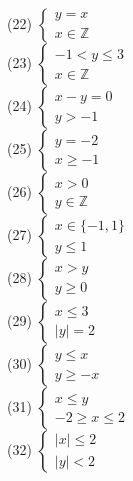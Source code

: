 \documentclass[10pt]{article}
\begin{document}
\begin{enumerate}
(22) \(\left\{\begin{array}{l}y=x \\ x \in \mathbb{Z}\end{array}\right.\)\\
(23) \(\left\{\begin{array}{l}-1<y \leqslant 3 \\ x \in \mathbb{Z}\end{array}\right.\)\\
(24) \(\left\{\begin{array}{l}x-y=0 \\ y>-1\end{array}\right.\)\\
(25) \(\left\{\begin{array}{l}y=-2 \\ x \geqslant-1\end{array}\right.\)\\
(26) \(\left\{\begin{array}{l}x>0 \\ y \in \mathbb{Z}\end{array}\right.\)\\
(27) \(\left\{\begin{array}{l}x \in\{-1,1\} \\ y \leqslant 1\end{array}\right.\)\\
(28) \(\left\{\begin{array}{l}x>y \\ y \geqslant 0\end{array}\right.\)\\
(29) \(\left\{\begin{array}{l}x \leqslant 3 \\ |y|=2\end{array}\right.\)\\
(30) \(\left\{\begin{array}{l}y \leqslant x \\ y \geqslant-x\end{array}\right.\)\\
(31) \(\left\{\begin{array}{l}x \leqslant y \\ -2 \geqslant x \leqslant 2\end{array}\right.\)\\
(32) \(\left\{\begin{array}{l}|x| \leqslant 2 \\ |y|<2\end{array}\right.\)\\

\end{enumerate}
\end{document}
